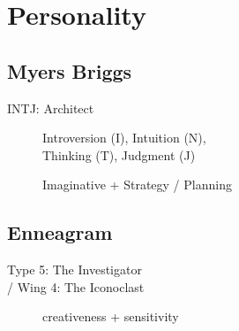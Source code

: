 \section*{Personality}




\subsection*{Myers Briggs}
\begin{description}

 \item[INTJ: Architect]
 Introversion (I),
 Intuition (N), \\
 Thinking (T),
 Judgment (J)
 \item[] Imaginative + Strategy / Planning
\end{description}


 \subsection*{Enneagram}
 \begin{description}

  \item[Type 5: The Investigator] %
 \item[/ Wing 4: The Iconoclast] %
 \item[] creativeness + sensitivity
 \end{description}



